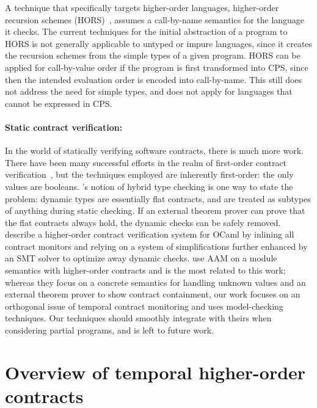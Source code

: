 A technique that specifically targets higher-order languages, higher-order recursion schemes (HORS)~\citep{ianjohnson:Knapik:2002:HPT:646794.704852}, assumes a call-by-name semantics for the language it checks.
%
The current techniques for the initial abstraction of a program to HORS is not generally applicable to untyped or impure languages, since it creates the recursion schemes from the simple types of a given program.
%
HORS can be applied for call-by-value order if the program is first transformed into CPS, since then the intended evaluation order is encoded into call-by-name.
%
This still does not address the need for simple types, and does not apply for languages that cannot be expressed in CPS.

\paragraph{Static contract verification:}
In the world of statically verifying software contracts, there is much more work.
%
There have been many successful efforts in the realm of first-order contract verification~\citep{ianjohnson:fahndrich:contracts:2011,ianjohnson:vcc:2009}, but the techniques employed are inherently first-order: the only values are booleans.
%
\citet{ianjohnson:Flanagan:2006:HTC:1111037.1111059}'s notion of hybrid type checking is one way to state the problem: dynamic types are essentially flat contracts, and are treated as subtypes of anything during static checking.
%
If an external theorem prover can prove that the flat contracts always hold, the dynamic checks can be safely removed.
%
\citet{dvanhorn:Xu2012Hybrid} describe a higher-order contract verification system for OCaml by inlining all contract monitors and relying on a system of simplifications further enhanced by an SMT solver to optimize away dynamic checks.
%
\citet{dvanhorn:TobinHochstadt2012Higherorder} use AAM on a module semantics with higher-order contracts and is the most related to this work; whereas they focus on a concrete semantics for handling unknown values and an external theorem prover to show contract containment, our work focuses on an orthogonal issue of temporal contract monitoring and uses model-checking techniques.
%
Our techniques should smoothly integrate with theirs when considering partial programs, and is left to future work.

\section{Overview of temporal higher-order contracts}

